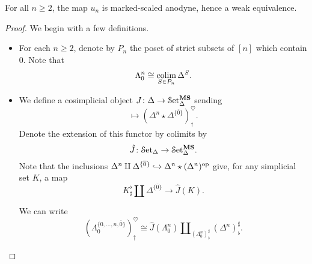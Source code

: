 \documentclass[main.tex]{subfiles}
\begin{document}
\begin{lemma}
  \label{lemma:upper_morphism_equivalence}
  For all $n \geq 2$, the map $u_{n}$ is marked-scaled anodyne, hence a weak equivalence.
\end{lemma}
\begin{proof}
  We begin with a few definitions.
  \begin{itemize}
    \item For each $n \geq 2$, denote by $P_{n}$ the poset of strict subsets of $[n]$ which contain $0$. Note that
      \begin{equation*}
        \Lambda^{n}_{0} \cong \operatorname*{colim}_{S \in P_{n}} \Delta^{S}.
      \end{equation*}

    \item We define a cosimplicial object $J\colon \Delta \to \mathcal{S}\mathrm{et}_{\Delta}^{\mathbf{MS}}$ sending
      \begin{equation*}
        [n] \mapsto (\Delta^{n} \star \Delta^{\{\overline{0}\}})^{\heartsuit}_{\dagger}.
      \end{equation*}
      Denote the extension of this functor by colimits by
      \begin{equation*}
        \hat{J}\colon \mathcal{S}\mathrm{et}_{\Delta} \to \mathcal{S}\mathrm{et}_{\Delta}^{\mathbf{MS}}.
      \end{equation*}
      Note that the inclusions $\Delta^{n} \amalg \Delta^{\{\overline{0}\}} \hookrightarrow \Delta^{n} \star (\Delta^{n})^{\mathrm{op}}$ give, for any simplicial set $K$, a map
      \begin{equation*}
        K^{\flat}_{\sharp} \amalg \Delta^{\{\overline{0}\}} \to \hat{J}(K).
      \end{equation*}

      We can write
      \begin{equation*}
        (\Lambda^{\{0, \ldots, n, \overline{0}\}}_{0})^{\heartsuit}_{\dagger} \cong \hat{J}(\Lambda^{n}_{0}) \amalg_{(\Lambda^{n}_{0})^{\sharp}_{\flat}} (\Delta^{n})^{\sharp}_{\flat}.
      \end{equation*}


\end{itemize}
\end{proof}
\end{document}
